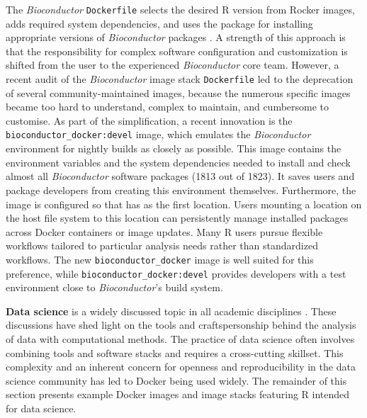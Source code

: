 The \emph{Bioconductor} \texttt{Dockerfile} selects the desired R
version from Rocker images, adds required system dependencies, and uses
the  package for installing appropriate versions of
\emph{Bioconductor} packages \citep{cran_biocmanager}. A strength of
this approach is that the responsibility for complex software
configuration and customization is shifted from the user to the
experienced \emph{Bioconductor} core team. However, a recent audit of
the \emph{Bioconductor} image stack \texttt{Dockerfile} led to the
deprecation of several community-maintained images, because the numerous
specific images became too hard to understand, complex to maintain, and
cumbersome to customise. As part of the simplification, a recent
innovation is the \texttt{bioconductor\_docker:devel} image, which
emulates the \emph{Bioconductor} environment for nightly builds as
closely as possible. This image contains the environment variables and
the system dependencies needed to install and check almost all
\emph{Bioconductor} software packages (1813 out of 1823). It saves users
and package developers from creating this environment themselves.
Furthermore, the image is configured so that  has
 as the first location. Users
mounting a location on the host file system to this location can
persistently manage installed packages across Docker containers or image
updates. Many R users pursue flexible workflows tailored to particular
analysis needs rather than standardized workflows. The new
\texttt{bioconductor\_docker} image is well suited for this preference,
while \texttt{bioconductor\_docker:devel} provides developers with a
test environment close to \emph{Bioconductor}'s build system.

\label{datascience} \textbf{Data science} is a widely discussed topic in
all academic disciplines \citep[e.g.,][]{donoho_50_2017}. These
discussions have shed light on the tools and craftspersonship behind the
analysis of data with computational methods. The practice of data
science often involves combining tools and software stacks and requires
a cross-cutting skillset. This complexity and an inherent concern for
openness and reproducibility in the data science community has led to
Docker being used widely. The remainder of this section presents example
Docker images and image stacks featuring R intended for data science.

